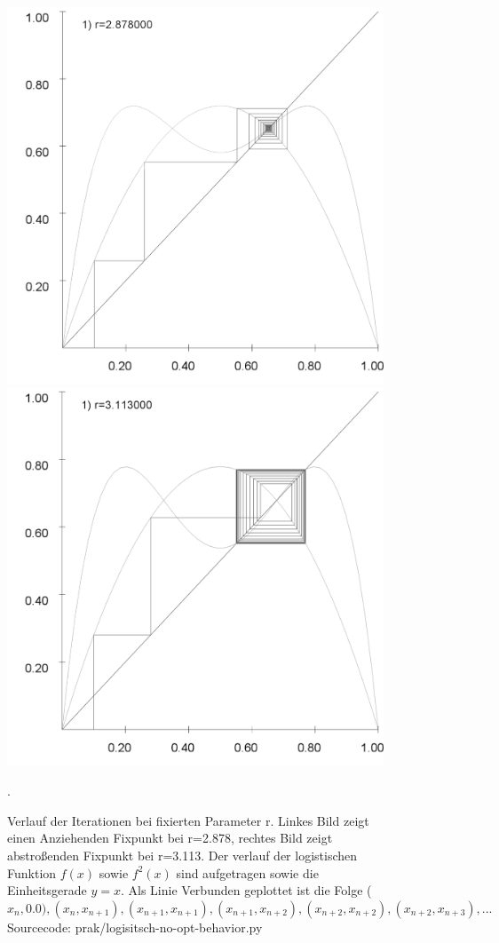 \documentclass{scrartcl}
\begin{document}
\begin{figure}
\centering
\includegraphics[scale=0.2]{fixpunkt-2878}
\includegraphics[scale=0.2]{fixpunkt-311}
\caption{Verlauf der Iterationen bei fixierten Parameter r. Linkes Bild zeigt einen Anziehenden Fixpunkt bei r=2.878, rechtes Bild zeigt abstroßenden Fixpunkt bei r=3.113. Der verlauf der logistischen Funktion $f(x)$ sowie $f^2(x)$ sind aufgetragen sowie die Einheitsgerade $y=x$. Als Linie Verbunden geplottet ist die Folge ($x_n, 0.0), (x_n, x_{n+1}), (x_{n+1}, x_{n+1}), (x_{n+1}, x_{n+2}), (x_{n+2}, x_{n+2}), (x_{n+2}, x_{n+3}), ...$ Sourcecode: prak/logisitsch-no-opt-behavior.py}. 
\end{figure}
\end{document}
